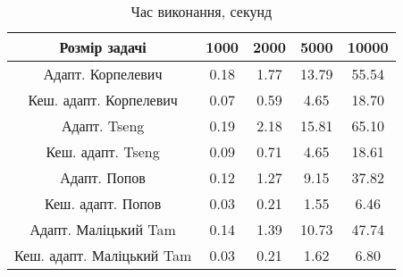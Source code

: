 \begin{table}[H]
	\centering
	\begin{tabular}{|c||c|c|c|c|}\hline
		Розмір задачі & 1000 & 2000 & 5000 & 10000 \\ \hline \hline
		Адапт. Корпелевич & 0.18 & 1.77 & 13.79 & 55.54 \\ \hline
		Кеш. адапт. Корпелевич & 0.07 & 0.59 & 4.65 & 18.70 \\ \hline
		Адапт. Tseng & 0.19 & 2.18 & 15.81 & 65.10 \\ \hline
		Кеш. адапт. Tseng & 0.09 & 0.71 & 4.65 & 18.61 \\ \hline
		Адапт. Попов & 0.12 & 1.27 & 9.15 & 37.82 \\ \hline
		Кеш. адапт. Попов & 0.03 & 0.21 & 1.55 & 6.46 \\ \hline
		Адапт. Маліцький Tam & 0.14 & 1.39 & 10.73 & 47.74 \\ \hline
		Кеш. адапт. Маліцький Tam & 0.03 & 0.21 & 1.62 & 6.80 \\ \hline
	\end{tabular}
	\caption{Час виконання, секунд}
\end{table}
